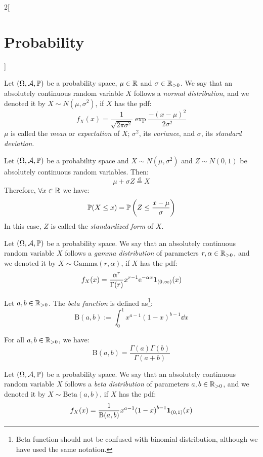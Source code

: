 \documentclass[../../../main.tex]{subfiles}
\begin{document}
\begin{multicols}{2}[\section{Probability}]
\begin{definition}
    Let $(\Omega,\mathcal{A},\mathbb{P})$ be a probability space, $\mu\in\mathbb{R}$ and $\sigma\in\mathbb{R}_{>0}$. We say that an absolutely continuous random variable $X$ follows a \textit{normal distribution}, and we denoted it by $X\sim N(\mu,\sigma^2)$, if $X$ has the pdf: $$f_X(x)=\frac{1}{\sqrt{2\pi\sigma^2}}\exp{\frac{-{(x-\mu)}^2}{2\sigma^2}}$$ $\mu$ is called the \textit{mean} or \textit{expectation} of $X$; $\sigma^2$, its \textit{variance}, and $\sigma$, its \textit{standard deviation}.
  \end{definition}
  \begin{center}
    \begin{minipage}{\linewidth}
      \centering
      
    \end{minipage}
  \end{center}
  \begin{prop}
    Let $(\Omega,\mathcal{A},\mathbb{P})$ be a probability space and $X\sim N(\mu,\sigma^2)$ and $Z\sim N(0,1)$ be absolutely continuous random variables. Then: $$\mu+\sigma Z\overset{\text{d}}{=} X$$ Therefore, $\forall x\in\mathbb{R}$ we have: $$\mathbb{P}(X\leq x)=\mathbb{P}\left(Z\leq\frac{x-\mu}{\sigma}\right)$$ In this case, $Z$ is called the \textit{standardized form} of $X$.
  \end{prop}
  \begin{definition}
    Let $(\Omega,\mathcal{A},\mathbb{P})$ be a probability space. We say that an absolutely continuous random variable $X$ follows a \textit{gamma distribution} of parameters $r,\alpha\in\mathbb{R}_{>0}$, and we denoted it by $X\sim \text{Gamma}(r,\alpha)$, if $X$ has the pdf: $$f_X(x)=\frac{\alpha^r}{\Gamma(r)}x^{r-1}\mathrm{e}^{-\alpha x}\boldsymbol{\mathrm{1}}_{(0,\infty)}(x)$$
  \end{definition}
  \begin{definition}
    Let $a,b\in\mathbb{R}_{>0}$. The \textit{beta function} is defined as\footnote{Beta function should not be confused with binomial distribution, although we have used the same notation.}: $$\text{B}(a,b):=\int_0^1x^{a-1}{(1-x)}^{b-1}\dd x$$
  \end{definition}
  \begin{prop}
    For all $a,b\in\mathbb{R}_{>0}$, we have: $$\text{B}(a,b)=\frac{\Gamma(a)\Gamma(b)}{\Gamma(a+b)}$$
  \end{prop}
  \begin{definition}
    Let $(\Omega,\mathcal{A},\mathbb{P})$ be a probability space. We say that an absolutely continuous random variable $X$ follows a \textit{beta distribution} of parameters $a,b\in\mathbb{R}_{>0}$, and we denoted it by $X\sim \text{Beta}(a,b)$, if $X$ has the pdf: $$f_X(x)=\frac{1}{\text{B}(a,b)}x^{a-1}{(1-x)}^{b-1}\boldsymbol{\mathrm{1}}_{(0,1)}(x)$$

\end{definition}
\end{multicols}
\end{document}
